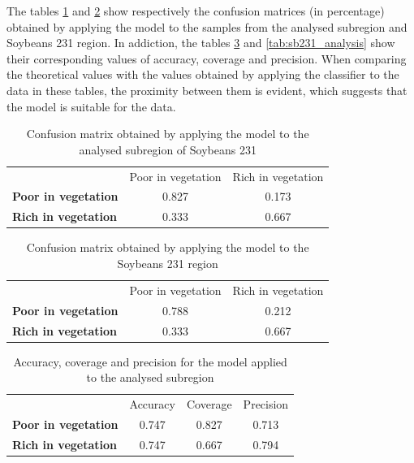\documentclass[12pt]{article}
\begin{document}
The tables \ref{tab:subregion_sb231_confusion_matrix} and \ref{tab:sb231_confusion_matrix} show respectively the confusion matrices (in percentage) obtained by applying the model to the samples from the analysed subregion and Soybeans 231 region. In addiction, the tables \ref{tab:subregion_sb231_analysis} and \ref{tab:sb231_analysis} show their corresponding values of accuracy, coverage and precision. When comparing the theoretical values with the values obtained by applying the classifier to the data in these tables, the proximity between them is evident, which suggests that the model is suitable for the data.

\begin{table}[hbt]
  \centering
  \caption{Confusion matrix obtained by applying the model to the analysed subregion of Soybeans 231}\label{tab:subregion_sb231_confusion_matrix}
  \begin{tabular}{lcc}
    \toprule
    & Poor in vegetation & Rich in vegetation\\
    \cmidrule{2-3}
    \textbf{Poor in vegetation} & 0.827 & 0.173\\
    \textbf{Rich in vegetation} & 0.333 & 0.667\\
    \bottomrule
  \end{tabular}
\end{table}

\begin{table}[hbt]
  \centering
  \caption{Confusion matrix obtained by applying the model to the Soybeans 231 region}\label{tab:sb231_confusion_matrix}
  \begin{tabular}{lcc}
    \toprule
    & Poor in vegetation & Rich in vegetation\\
    \cmidrule{2-3}
    \textbf{Poor in vegetation} & 0.788 & 0.212\\
    \textbf{Rich in vegetation} & 0.333 & 0.667\\
    \bottomrule
  \end{tabular}
\end{table}

\begin{table}[hbt]
  \centering
  \caption{Accuracy, coverage and precision for the model applied to the analysed subregion}\label{tab:subregion_sb231_analysis}
  \begin{tabular}{lccc}
    \toprule
    & Accuracy & Coverage & Precision\\
    \cmidrule{2-4}
    \textbf{Poor in vegetation} & 0.747 & 0.827 & 0.713\\
    \textbf{Rich in vegetation} & 0.747 & 0.667 & 0.794\\
    \bottomrule
  \end{tabular}
\end{table}
\end{document}
